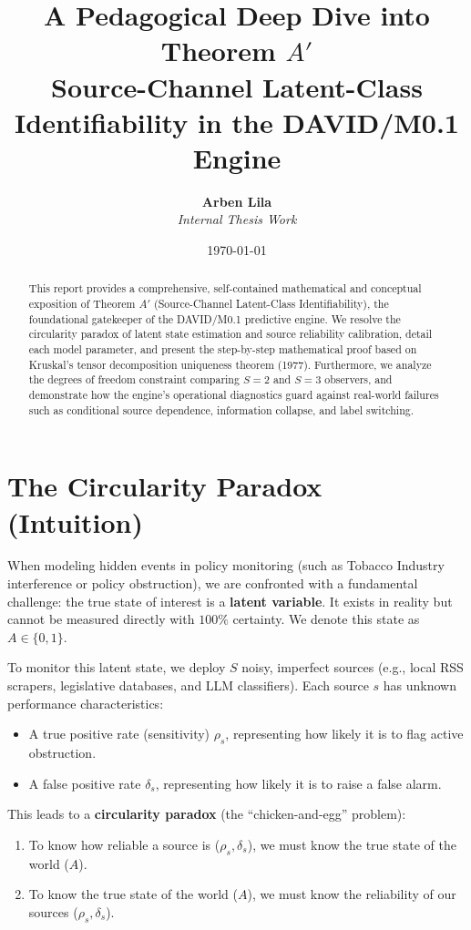 \documentclass[11pt,a4paper]{article}
\title{\textbf{A Pedagogical Deep Dive into Theorem $A'$}\\
\large Source-Channel Latent-Class Identifiability in the DAVID/M0.1 Engine}
\author{\textbf{Arben Lila} \\ \textit{Internal Thesis Work}}
\date{\today}
\begin{document}
\maketitle

\begin{abstract}
This report provides a comprehensive, self-contained mathematical and conceptual exposition of Theorem $A'$ (Source-Channel Latent-Class Identifiability), the foundational gatekeeper of the DAVID/M0.1 predictive engine. We resolve the circularity paradox of latent state estimation and source reliability calibration, detail each model parameter, and present the step-by-step mathematical proof based on Kruskal's tensor decomposition uniqueness theorem (1977). Furthermore, we analyze the degrees of freedom constraint comparing $S=2$ and $S=3$ observers, and demonstrate how the engine's operational diagnostics guard against real-world failures such as conditional source dependence, information collapse, and label switching.
\end{abstract}

\tableofcontents
\newpage

\section{The Circularity Paradox (Intuition)}
When modeling hidden events in policy monitoring (such as Tobacco Industry interference or policy obstruction), we are confronted with a fundamental challenge: the true state of interest is a \textbf{latent variable}. It exists in reality but cannot be measured directly with $100\%$ certainty. We denote this state as $A \in \{0, 1\}$.

To monitor this latent state, we deploy $S$ noisy, imperfect sources (e.g., local RSS scrapers, legislative databases, and LLM classifiers). Each source $s$ has unknown performance characteristics:
\begin{itemize}
    \item A true positive rate (sensitivity) $\rho_s$, representing how likely it is to flag active obstruction.
    \item A false positive rate $\delta_s$, representing how likely it is to raise a false alarm.
\end{itemize}

This leads to a \textbf{circularity paradox} (the ``chicken-and-egg'' problem):
\begin{enumerate}
    \item To know how reliable a source is ($\rho_s, \delta_s$), we must know the true state of the world ($A$).
    \item To know the true state of the world ($A$), we must know the reliability of our sources ($\rho_s, \delta_s$).
\end{enumerate}
\end{document}
